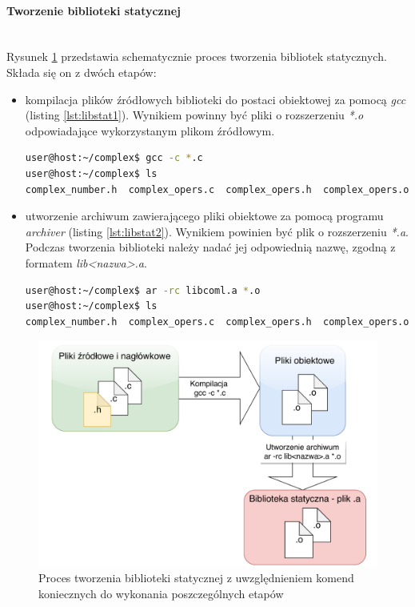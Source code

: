 \paragraph*{Tworzenie biblioteki statycznej}\mbox{}\\
Rysunek \ref{fig:staticlibflow} przedstawia schematycznie proces tworzenia bibliotek statycznych. Składa się on z dwóch etapów:
\begin{itemize}
\item kompilacja plików źródłowych biblioteki do postaci obiektowej za pomocą \textit{gcc} (listing \ref{lst:libstat1}). Wynikiem powinny być pliki o rozszerzeniu \textit{*.o} odpowiadające wykorzystanym plikom źródłowym.

\begin{lstlisting}[language=bash, caption={Kompilacja plików źródłowych biblioteki do postaci obiektowej - polecenie oraz jego wynik},label={lst:libstat1}]
user@host:~/complex$ gcc -c *.c
user@host:~/complex$ ls
complex_number.h  complex_opers.c  complex_opers.h  complex_opers.o
\end{lstlisting}


\item utworzenie archiwum zawierającego pliki obiektowe za pomocą programu \textit{archiver} (listing \ref{lst:libstat2}). Wynikiem powinien być plik o rozszerzeniu \textit{*.a}. Podczas tworzenia biblioteki należy nadać jej odpowiednią nazwę, zgodną z formatem \textit{lib<nazwa>.a}.

\begin{lstlisting}[language=bash, caption={Utworzenie biblioteki statycznej z plików obiektowych - polecenie oraz jego wynik},label={lst:libstat2}]
user@host:~/complex$ ar -rc libcoml.a *.o
user@host:~/complex$ ls
complex_number.h  complex_opers.c  complex_opers.h  complex_opers.o  libcoml.a
\end{lstlisting}

\end{itemize}

\begin{figure}%
\centering
\caption{Proces tworzenia biblioteki statycznej z uwzględnieniem komend koniecznych do wykonania poszczególnych etapów}
\label{fig:staticlibflow}
\includegraphics[width=\textwidth]{res/StaticLibFlow}
\end{figure}


